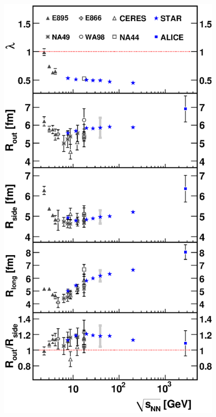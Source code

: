 \documentclass[dvipsnames] {beamer}
\begin{document}
\begin{frame}
\begin{columns}[t]
          
          \begin{block}{\bf {}}
            \begin{figure}[H]
              \includegraphics[width=1.\linewidth]{RiRootS.eps}
            \end{figure}
          \end{block}


\end{columns}
\end{frame}
\end{document}
